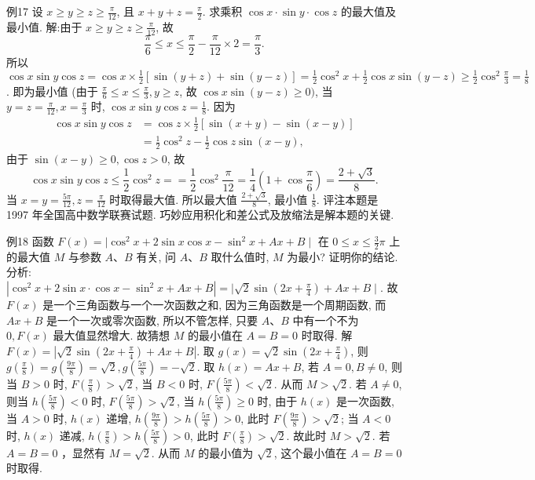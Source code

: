 例17 设 $x \geqslant y \geqslant z \geqslant \frac{\pi}{12}$, 且 $x+y+z=\frac{\pi}{2}$.
求乘积 $\cos x \cdot \sin y \cdot \cos z$ 的最大值及最小值.
解:由于 $x \geqslant y \geqslant z \geqslant \frac{\pi}{12}$, 故
$$
\frac{\pi}{6} \leqslant x \leqslant \frac{\pi}{2}-\frac{\pi}{12} \times 2=\frac{\pi}{3} .
$$
所以 $\cos x \sin y \cos z=\cos x \times \frac{1}{2}[\sin (y+z)+\sin (y-z)]=\frac{1}{2} \cos ^2 x+ \frac{1}{2} \cos x \sin (y-z) \geqslant \frac{1}{2} \cos ^2 \frac{\pi}{3}=\frac{1}{8}$. 即为最小值 (由于 $\frac{\pi}{6} \leqslant x \leqslant \frac{\pi}{3}, y \geqslant z$, 故 $\cos x \sin (y-z) \geqslant 0)$, 当 $y=z=\frac{\pi}{12}, x=\frac{\pi}{3}$ 时, $\cos x \sin y \cos z=\frac{1}{8}$.
因为
$$
\begin{aligned}
\cos x \sin y \cos z & =\cos z \times \frac{1}{2}[\sin (x+y)-\sin (x-y)] \\
& =\frac{1}{2} \cos ^2 z-\frac{1}{2} \cos z \sin (x-y),
\end{aligned}
$$
由于 $\sin (x-y) \geqslant 0, \cos z>0$, 故
$$
\cos x \sin y \cos z \leqslant \frac{1}{2} \cos ^2 z==\frac{1}{2} \cos ^2 \frac{\pi}{12}=\frac{1}{4}\left(1+\cos \frac{\pi}{6}\right)=\frac{2+\sqrt{3}}{8} .
$$
当 $x=y=\frac{5 \pi}{12}, z=\frac{\pi}{12}$ 时取得最大值.
所以最大值 $\frac{2+\sqrt{3}}{8}$, 最小值 $\frac{1}{8}$.
评注本题是 1997 年全国高中数学联赛试题.
巧妙应用积化和差公式及放缩法是解本题的关键.



例18 函数 $F(x)=\mid \cos ^2 x+2 \sin x \cos x- \sin ^2 x+A x+B \mid$ 在 $0 \leqslant x \leqslant \frac{3}{2} \pi$ 上的最大值 $M$ 与参数 $A 、 B$ 有关, 问 $A 、 B$ 取什么值时, $M$ 为最小? 证明你的结论.
分析:$\left|\cos ^2 x+2 \sin x \cdot \cos x-\sin ^2 x+A x+B\right|=\mid \sqrt{2} \sin \left(2 x+\frac{\pi}{4}\right)+ A x+B \mid$. 故 $F(x)$ 是一个三角函数与一个一次函数之和, 因为三角函数是一个周期函数, 而 $A x+B$ 是一个一次或零次函数, 所以不管怎样, 只要 $A 、 B$ 中有一个不为 $0, F(x)$ 最大值显然增大.
故猜想 $M$ 的最小值在 $A=B=0$ 时取得.
解 $F(x)=\left|\sqrt{2} \sin \left(2 x+\frac{\pi}{4}\right)+A x+B\right|$. 取 $g(x)=\sqrt{2} \sin \left(2 x+\frac{\pi}{4}\right)$, 则 $g\left(\frac{\pi}{8}\right)=g\left(\frac{9 \pi}{8}\right)=\sqrt{2}, g\left(\frac{5 \pi}{8}\right)=-\sqrt{2}$.
取 $h(x)=A x+B$, 若 $A=0, B \neq 0$, 则当 $B>0$ 时, $F\left(\frac{\pi}{8}\right)>\sqrt{2}$, 当 $B<0$ 时, $F\left(\frac{5 \pi}{8}\right)<\sqrt{2}$. 从而 $M>\sqrt{2}$.
若 $A \neq 0$, 则当 $h\left(\frac{5 \pi}{8}\right)<0$ 时, $F\left(\frac{5 \pi}{8}\right)>\sqrt{2}$, 当 $h\left(\frac{5 \pi}{8}\right) \geqslant 0$ 时, 由于 $h(x)$ 是一次函数, 当 $A>0$ 时, $h(x)$ 递增, $h\left(\frac{9 \pi}{8}\right)>h\left(\frac{5 \pi}{8}\right)>0$, 此时 $F\left(\frac{9 \pi}{8}\right)>\sqrt{2}$; 当 $A<0$ 时, $h(x)$ 递减, $h\left(\frac{\pi}{8}\right)>h\left(\frac{5 \pi}{8}\right)>0$, 此时 $F\left(\frac{\pi}{8}\right)>\sqrt{2}$. 故此时 $M>\sqrt{2}$. 若 $A=B=0$ ，显然有 $M=\sqrt{2}$.
从而 $M$ 的最小值为 $\sqrt{2}$, 这个最小值在 $A=B=0$ 时取得.



